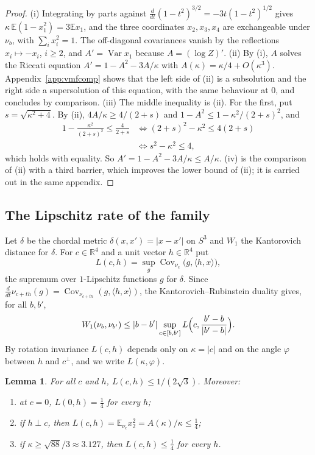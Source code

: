 \documentclass[aps,prd,twocolumn,superscriptaddress,nofootinbib,longbibliography,floatfix,amsmath,amssymb,10pt]{revtex4-2}
\newtheorem{lemma}[theorem]{Lemma}
\theoremstyle{definition}
\theoremstyle{remark}
\newcommand{\R}{\mathbb{R}}
\newcommand{\E}{\mathbb{E}}
\newcommand{\Cov}{\operatorname{Cov}}
\newcommand{\Var}{\operatorname{Var}}
\newcommand{\ip}[2]{\langle #1,#2\rangle}
\begin{document}
\begin{proof}
(i) Integrating by parts against $\frac{d}{dt}(1-t^2)^{3/2}=-3t(1-t^2)^{1/2}$
gives $\kappa\,\E(1-x_1^2)=3\E x_1$, and the three coordinates
$x_2,x_3,x_4$ are exchangeable under $\nu_b$, with $\sum_ix_i^2=1$. The
off-diagonal covariances vanish by the reflections $x_i\mapsto-x_i$,
$i\ge2$, and $A'=\Var x_1$ because $A=(\log Z)'$.
(ii) By (i), $A$ solves the Riccati equation $A'=1-A^2-3A/\kappa$ with
$A(\kappa)=\kappa/4+O(\kappa^3)$. Appendix~\ref{app:vmfcomp} shows that the left
side of (ii) is a subsolution and the right side a supersolution of this
equation, with the same behaviour at $0$, and concludes by comparison.
(iii) The middle inequality is (ii). For the first, put $s=\sqrt{\kappa^2+4}$.
By (ii), $4A/\kappa\ge4/(2+s)$ and $1-A^2\le1-\kappa^2/(2+s)^2$, and
\[
\begin{aligned}
1-\frac{\kappa^2}{(2+s)^2}\le\frac4{2+s}
&\iff(2+s)^2-\kappa^2\le4(2+s)\\
&\iff s^2-\kappa^2\le4,
\end{aligned}
\]
which holds with equality. So $A'=1-A^2-3A/\kappa\le A/\kappa$.
(iv) is the comparison of (ii) with a third barrier, which improves the
lower bound of (ii); it is carried out in the same appendix.
\end{proof}

\subsection{The Lipschitz rate of the family}

Let $\delta$ be the chordal metric $\delta(x,x')=|x-x'|$ on $S^3$ and $W_1$
the Kantorovich distance for $\delta$. For $c\in\R^4$ and a unit vector
$h\in\R^4$ put
\begin{equation}\label{q-eq:rate}
L(c,h)=\sup_g\Cov_{\nu_c}\bigl(g,\ip hx\bigr),
\end{equation}
the supremum over $1$-Lipschitz functions $g$ for $\delta$. Since
$\frac{d}{dt}\nu_{c+th}(g)=\Cov_{\nu_{c+th}}(g,\ip hx)$, the
Kantorovich--Rubinstein duality gives, for all $b,b'$,
\begin{equation}\label{q-eq:w1segment}
W_1(\nu_b,\nu_{b'})\le|b-b'|\sup_{c\in[b,b']}L\Bigl(c,\frac{b'-b}{|b'-b|}
\Bigr).
\end{equation}
By rotation invariance $L(c,h)$ depends only on $\kappa=|c|$ and on the angle
$\varphi$ between $h$ and $c^\perp$, and we write $L(\kappa,\varphi)$.

\begin{lemma}\label{q-lem:rate}
For all $c$ and $h$, $L(c,h)\le1/(2\sqrt3)$. Moreover:
\begin{enumerate}[label=\textup{(\roman*)},leftmargin=*]
\item at $c=0$, $L(0,h)=\frac14$ for every $h$;
\item if $h\perp c$, then $L(c,h)=\E_{\nu_c}x_2^2=A(\kappa)/\kappa\le\frac14$;
\item if $\kappa\ge\sqrt{88}/3\approx3.127$, then $L(c,h)\le\frac14$ for
every $h$.
\end{enumerate}
\end{lemma}
\end{document}
